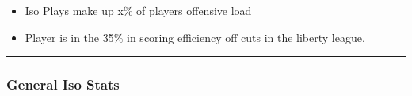 \documentclass[a4paper,12pt]{article}
\begin{document}
\begin{itemize}
    \item Iso Plays make up x\% of players offensive load
    \vspace{0.3em} %
    \item Player is in the 35\% in scoring efficiency off cuts in the liberty league.
\end{itemize}

\vspace{1em} %
\hrule height 1pt width 1\textwidth %
\vspace{0em} %

\subsubsection{General Iso Stats}
\end{document}
